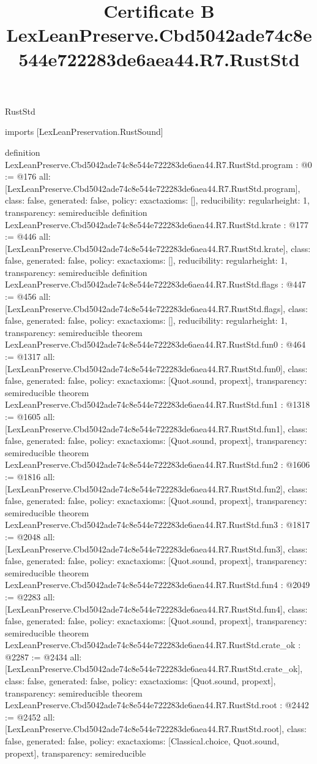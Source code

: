 \begin{lexlean}{RustStd}
\title{Certificate B LexLeanPreserve.Cbd5042ade74c8e544e722283de6aea44.R7.RustStd}
\begin{coremodule}
imports [LexLeanPreservation.RustSound]

definition LexLeanPreserve.Cbd5042ade74c8e544e722283de6aea44.R7.RustStd.program : @0 := @176 {
  all: [LexLeanPreserve.Cbd5042ade74c8e544e722283de6aea44.R7.RustStd.program],
  class: false,
  generated: false,
  policy: exact{axioms: []},
  reducibility: regular{height: 1},
  transparency: semireducible
}
definition LexLeanPreserve.Cbd5042ade74c8e544e722283de6aea44.R7.RustStd.krate : @177 := @446 {
  all: [LexLeanPreserve.Cbd5042ade74c8e544e722283de6aea44.R7.RustStd.krate],
  class: false,
  generated: false,
  policy: exact{axioms: []},
  reducibility: regular{height: 1},
  transparency: semireducible
}
definition LexLeanPreserve.Cbd5042ade74c8e544e722283de6aea44.R7.RustStd.flags : @447 := @456 {
  all: [LexLeanPreserve.Cbd5042ade74c8e544e722283de6aea44.R7.RustStd.flags],
  class: false,
  generated: false,
  policy: exact{axioms: []},
  reducibility: regular{height: 1},
  transparency: semireducible
}
theorem LexLeanPreserve.Cbd5042ade74c8e544e722283de6aea44.R7.RustStd.fun0 : @464 := @1317 {
  all: [LexLeanPreserve.Cbd5042ade74c8e544e722283de6aea44.R7.RustStd.fun0],
  class: false,
  generated: false,
  policy: exact{axioms: [Quot.sound, propext]},
  transparency: semireducible
}
theorem LexLeanPreserve.Cbd5042ade74c8e544e722283de6aea44.R7.RustStd.fun1 : @1318 := @1605 {
  all: [LexLeanPreserve.Cbd5042ade74c8e544e722283de6aea44.R7.RustStd.fun1],
  class: false,
  generated: false,
  policy: exact{axioms: [Quot.sound, propext]},
  transparency: semireducible
}
theorem LexLeanPreserve.Cbd5042ade74c8e544e722283de6aea44.R7.RustStd.fun2 : @1606 := @1816 {
  all: [LexLeanPreserve.Cbd5042ade74c8e544e722283de6aea44.R7.RustStd.fun2],
  class: false,
  generated: false,
  policy: exact{axioms: [Quot.sound, propext]},
  transparency: semireducible
}
theorem LexLeanPreserve.Cbd5042ade74c8e544e722283de6aea44.R7.RustStd.fun3 : @1817 := @2048 {
  all: [LexLeanPreserve.Cbd5042ade74c8e544e722283de6aea44.R7.RustStd.fun3],
  class: false,
  generated: false,
  policy: exact{axioms: [Quot.sound, propext]},
  transparency: semireducible
}
theorem LexLeanPreserve.Cbd5042ade74c8e544e722283de6aea44.R7.RustStd.fun4 : @2049 := @2283 {
  all: [LexLeanPreserve.Cbd5042ade74c8e544e722283de6aea44.R7.RustStd.fun4],
  class: false,
  generated: false,
  policy: exact{axioms: [Quot.sound, propext]},
  transparency: semireducible
}
theorem LexLeanPreserve.Cbd5042ade74c8e544e722283de6aea44.R7.RustStd.crate_ok : @2287 := @2434 {
  all: [LexLeanPreserve.Cbd5042ade74c8e544e722283de6aea44.R7.RustStd.crate_ok],
  class: false,
  generated: false,
  policy: exact{axioms: [Quot.sound, propext]},
  transparency: semireducible
}
theorem LexLeanPreserve.Cbd5042ade74c8e544e722283de6aea44.R7.RustStd.root : @2442 := @2452 {
  all: [LexLeanPreserve.Cbd5042ade74c8e544e722283de6aea44.R7.RustStd.root],
  class: false,
  generated: false,
  policy: exact{axioms: [Classical.choice, Quot.sound, propext]},
  transparency: semireducible
}


\end{coremodule}
\end{lexlean}
